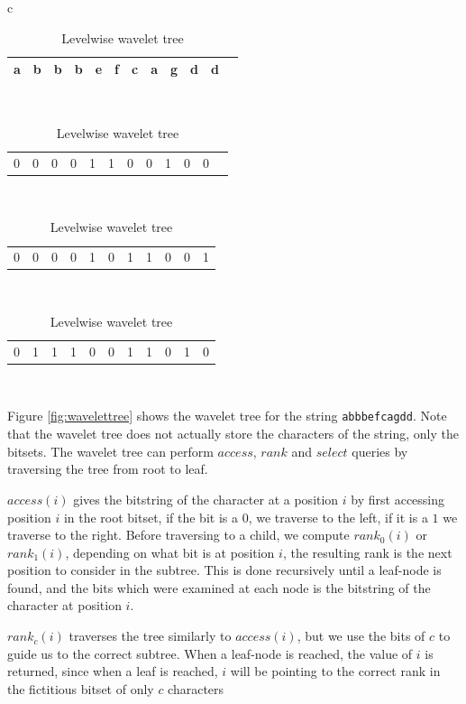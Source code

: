 \begin{table}[t]
	\begin{center}
		\begin{tabular}{c}
            \begin{tabular}{c c c c c c c c c c c c}
                a & b & b & b & e & f & c & a & g & d & d \\
                \hline
            \end{tabular} \\
            \begin{tabular}{c c c c c c c c c c c c}
                0 & 0 & 0 & 0 & 1 & 1 & 0 & 0 & 1 & 0 & 0
            \end{tabular} \\
            \begin{tabular}{c c c c c c c c|c c c}
                0 & 0 & 0 & 0 & 1 & 0 & 1 & 1 & 0 & 0 & 1
            \end{tabular} \\
            \begin{tabular}{c c c c c|c c c|c c|c}
                0 & 1 & 1 & 1 & 0 & 0 & 1 & 1 & 0 & 1 & 0
            \end{tabular} \\
		\end{tabular}
		\caption{Levelwise wavelet tree}
		\label{table:levelwisewavelettree}
	\end{center}
\end{table}




Figure \ref{fig:wavelettree} shows the wavelet tree for the string \verb|abbbefcagdd|.
Note that the wavelet tree does not actually store the characters of the string, only the
bitsets. The wavelet tree can perform $access$, $rank$ and $select$ queries by traversing
the tree from root to leaf. 

$access(i)$ gives the bitstring of the character at a position $i$ by first accessing
position $i$ in the root bitset, if the bit is a $0$, we traverse to the left, if it is a
$1$ we traverse to the right. Before traversing to a child, we compute $rank_0(i)$ or
$rank_1(i)$, depending on what bit is at position $i$, the resulting rank is the next
position to consider in the subtree. This is done recursively until a leaf-node is found,
and the bits which were examined at each node is the bitstring of the character at
position $i$.

$rank_c(i)$ traverses the tree similarly to $access(i)$, but we use the bits of $c$ to
guide us to the correct subtree. When a leaf-node is reached, the value of $i$ is
returned, since when a leaf is reached, $i$ will be pointing to the correct rank in the
fictitious bitset of only $c$ characters

